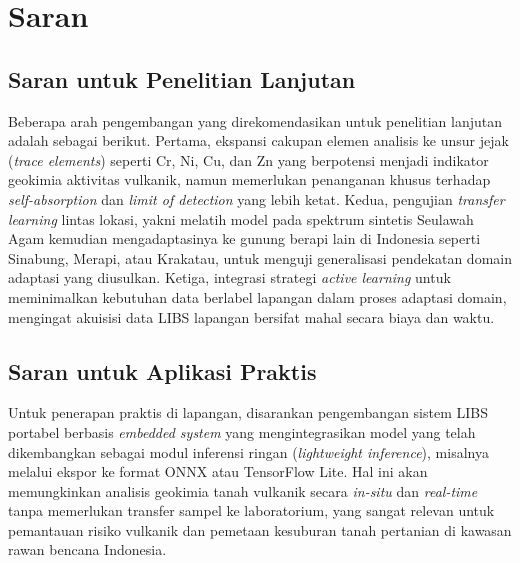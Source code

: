\section{Saran}

\subsection{Saran untuk Penelitian Lanjutan}

Beberapa arah pengembangan yang direkomendasikan untuk penelitian lanjutan adalah sebagai berikut. Pertama, ekspansi cakupan elemen analisis ke unsur jejak (\textit{trace elements}) seperti Cr, Ni, Cu, dan Zn yang berpotensi menjadi indikator geokimia aktivitas vulkanik, namun memerlukan penanganan khusus terhadap \textit{self-absorption} dan \textit{limit of detection} yang lebih ketat. Kedua, pengujian \textit{transfer learning} lintas lokasi, yakni melatih model pada spektrum sintetis Seulawah Agam kemudian mengadaptasinya ke gunung berapi lain di Indonesia seperti Sinabung, Merapi, atau Krakatau, untuk menguji generalisasi pendekatan domain adaptasi yang diusulkan. Ketiga, integrasi strategi \textit{active learning} untuk meminimalkan kebutuhan data berlabel lapangan dalam proses adaptasi domain, mengingat akuisisi data LIBS lapangan bersifat mahal secara biaya dan waktu.

\subsection{Saran untuk Aplikasi Praktis}

Untuk penerapan praktis di lapangan, disarankan pengembangan sistem LIBS portabel berbasis \textit{embedded system} yang mengintegrasikan model yang telah dikembangkan sebagai modul inferensi ringan (\textit{lightweight inference}), misalnya melalui ekspor ke format ONNX atau TensorFlow Lite. Hal ini akan memungkinkan analisis geokimia tanah vulkanik secara \textit{in-situ} dan \textit{real-time} tanpa memerlukan transfer sampel ke laboratorium, yang sangat relevan untuk pemantauan risiko vulkanik dan pemetaan kesuburan tanah pertanian di kawasan rawan bencana Indonesia.
